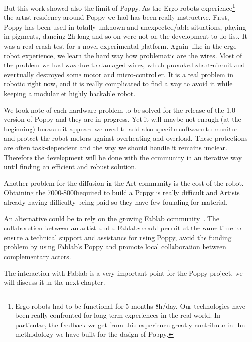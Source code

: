 But this work showed also the limit of Poppy. As the Ergo-robots experience\footnote{Ergo-robots had to be functional for 5 months 8h/day. Our technologies have been really confronted for long-term experiences in the real world. In particular, the feedback we get from this experience greatly contribute in the methodology we have built for the design of Poppy.}, the artist residency around Poppy we had has been really instructive. First, Poppy has been used in totally unknown and unexpected/able situations, playing in pigments, dancing 2h long and so on were not on the development to-do list.
It was a real crash test for a novel experimental platform. Again, like in the ergo-robot experience, we learn the hard way how problematic are the wires. Most of the problem we had was due to damaged wires, which provoked short-circuit and eventually destroyed some motor and micro-controller. It is a real problem in robotic right now, and it is really complicated to find a way to avoid it while keeping a modular et highly hackable robot.

We took note of each hardware problem to be solved for the release of the 1.0 version of Poppy and they are in progress. Yet it will maybe not enough (at the beginning) because it appears we need to add also specific software to monitor and protect the robot motors against overheating and overload. These protections are often task-dependent and the way we should handle it remains unclear. Therefore the development will be done with the community in an iterative way until finding an efficient and robust solution.

Another problem for the diffusion in the Art community is the cost of the robot. Obtaining the 7000-8000\texteuro required to build a Poppy is really difficult and Artists already having difficulty being paid so they have few founding for material.

An alternative could be to rely on the growing Fablab community~\cite{anderson}. The collaboration between an artist and a Fablabs could permit at the same time to ensure a technical support and assistance for using Poppy, avoid the funding problem by using Fablab's Poppy and promote local collaboration between complementary actors.

The interaction with Fablab is a very important point for the Poppy project, we will discuss it in the next chapter.

